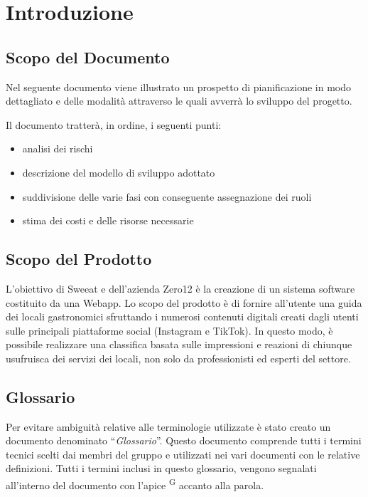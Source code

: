 \section{Introduzione}

\subsection{Scopo del Documento}
Nel seguente documento viene illustrato un prospetto di pianificazione in modo dettagliato e delle modalità attraverso le quali avverrà lo sviluppo del progetto. 

Il documento tratterà,  in ordine,  i seguenti punti:
\begin{itemize}
\item analisi dei rischi
\item descrizione del modello di sviluppo adottato
\item suddivisione delle varie fasi con conseguente assegnazione dei ruoli
\item stima dei costi e delle risorse necessarie
\end{itemize}

\subsection{Scopo del Prodotto}

L’obiettivo di Sweeat e dell’azienda Zero12 è la creazione di un sistema software costituito da una Webapp. Lo scopo del prodotto è di fornire all’utente una guida dei locali gastronomici sfruttando i numerosi contenuti digitali creati dagli utenti sulle principali piattaforme social (Instagram e TikTok). In questo modo, è possibile realizzare una classifica basata sulle impressioni e reazioni di chiunque usufruisca dei servizi dei locali, non solo da professionisti ed esperti del settore.

\subsection{Glossario}

Per evitare ambiguità relative alle terminologie utilizzate è stato creato un documento denominato “\textit{Glossario}”. Questo documento comprende tutti i termini tecnici scelti dai membri del gruppo e utilizzati nei vari documenti con le relative definizioni. Tutti i termini inclusi in questo glossario, vengono segnalati all’interno del documento con l’apice \textsuperscript{G} accanto alla parola.

